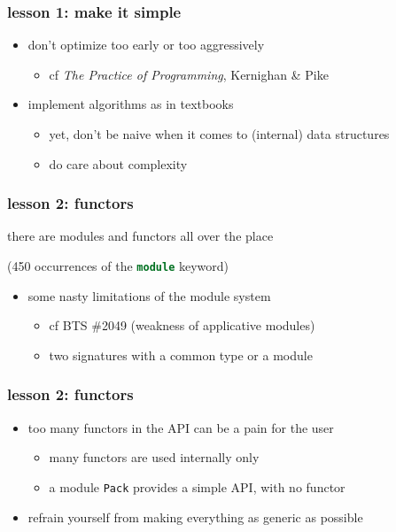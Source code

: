 \documentclass{beamer}
\newcommand{\of}[1]{\lstinline[language=ocaml]{#1}}
\begin{document}
\begin{frame}\frametitle{lesson 1: make it simple}
  \begin{itemize}
  \item don't optimize too early or too aggressively
    \begin{itemize}
    \item cf \textit{The Practice of Programming}, Kernighan \& Pike
    \end{itemize}

  \bigskip
  \item implement algorithms as in textbooks
    \begin{itemize}
    \item yet, don't be naive when it comes to (internal) data structures
    \item do care about complexity
    \end{itemize}
  \end{itemize}
\end{frame}

\begin{frame}\frametitle{lesson 2: functors}
  there are modules and functors all over the place

  (450 occurrences of the \of{module} keyword)

  \bigskip
  \begin{itemize}
  \item some nasty limitations of the module system
    \begin{itemize}
    \item cf BTS \#2049 (weakness of applicative modules)
    \item two signatures with a common type or a module
    \end{itemize}
  \end{itemize}
\end{frame}

\begin{frame}\frametitle{lesson 2: functors}
  \begin{itemize}
  \item too many functors in the API can be a pain for the user
    \begin{itemize}
    \item many functors are used internally only
    \item a module \of{Pack} provides a simple API, with no functor
    \end{itemize}

  \bigskip
  \item refrain yourself from making everything as generic as possible
  \end{itemize}
\end{frame}
\end{document}
